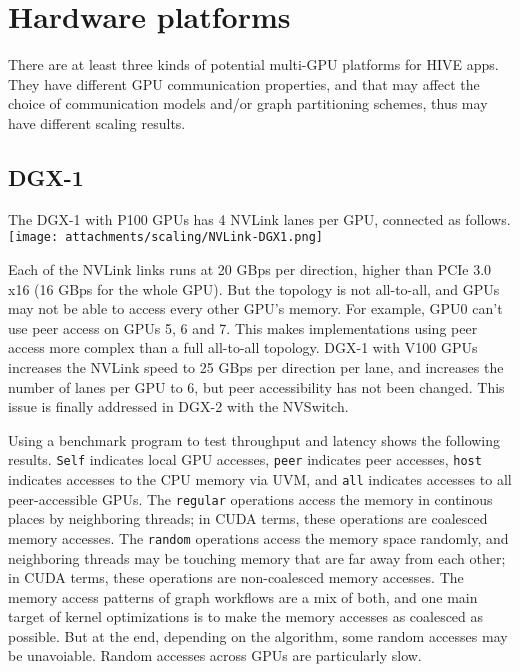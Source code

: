\documentclass[10pt,oneside]{memoir}
\begin{document}
\hypertarget{hardware-platforms}{%
\section{Hardware platforms}\label{hardware-platforms}}

There are at least three kinds of potential multi-GPU platforms for HIVE
apps. They have different GPU communication properties, and that may
affect the choice of communication models and/or graph partitioning
schemes, thus may have different scaling results.

\hypertarget{dgx-1}{%
\subsection{DGX-1}\label{dgx-1}}

The DGX-1 with P100 GPUs has 4 NVLink lanes per GPU, connected as
follows. \texttt{[image: attachments/scaling/NVLink-DGX1.png]}

Each of the NVLink links runs at 20 GBps per direction, higher than PCIe
3.0 x16 (16 GBps for the whole GPU). But the topology is not all-to-all,
and GPUs may not be able to access every other GPU's memory. For
example, GPU0 can't use peer access on GPUs 5, 6 and 7. This makes
implementations using peer access more complex than a full all-to-all
topology. DGX-1 with V100 GPUs increases the NVLink speed to 25 GBps per
direction per lane, and increases the number of lanes per GPU to 6, but
peer accessibility has not been changed. This issue is finally addressed
in DGX-2 with the NVSwitch.

Using a benchmark program to test throughput and latency shows the
following results. \texttt{Self} indicates local GPU accesses,
\texttt{peer} indicates peer accesses, \texttt{host} indicates accesses
to the CPU memory via UVM, and \texttt{all} indicates accesses to all
peer-accessible GPUs. The \texttt{regular} operations access the memory
in continous places by neighboring threads; in CUDA terms, these
operations are coalesced memory accesses. The \texttt{random} operations
access the memory space randomly, and neighboring threads may be
touching memory that are far away from each other; in CUDA terms, these
operations are non-coalesced memory accesses. The memory access patterns
of graph workflows are a mix of both, and one main target of kernel
optimizations is to make the memory accesses as coalesced as possible.
But at the end, depending on the algorithm, some random accesses may be
unavoiable. Random accesses across GPUs are particularly slow.
\end{document}
